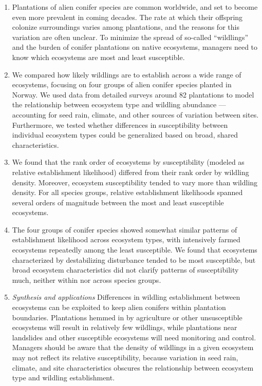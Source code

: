 \documentclass[
]{article}
\providecommand{\tightlist}{%
  \setlength{\itemsep}{0pt}\setlength{\parskip}{0pt}}
\begin{document}
\begin{enumerate}
\def\labelenumi{\arabic{enumi}.}
\tightlist
\item
  Plantations of alien conifer species are common worldwide, and set to become even more prevalent in coming decades. The rate at which their offspring colonize surroundings varies among plantations, and the reasons for this variation are often unclear. To minimize the spread of so-called ``wildlings'' and the burden of conifer plantations on native ecosystems, managers need to know which ecosystems are most and least susceptible.
\item
  We compared how likely wildlings are to establish across a wide range of ecosystems, focusing on four groups of alien conifer species planted in Norway. We used data from detailed surveys around 82 plantations to model the relationship between ecosystem type and wildling abundance --- accounting for seed rain, climate, and other sources of variation between sites. Furthermore, we tested whether differences in susceptibility between individual ecosystem types could be generalized based on broad, shared characteristics.
\item
  We found that the rank order of ecosystems by susceptibility (modeled as relative establishment likelihood) differed from their rank order by wildling density. Moreover, ecosystem susceptibility tended to vary more than wildling density. For all species groups, relative establishment likelihoods spanned several orders of magnitude between the most and least susceptible ecosystems.
\item
  The four groups of conifer species showed somewhat similar patterns of establishment likelihood across ecosystem types, with intensively farmed ecosystems repeatedly among the least susceptible. We found that ecosystems characterized by destabilizing disturbance tended to be most susceptible, but broad ecosystem characteristics did not clarify patterns of susceptibility much, neither within nor across species groups.
\item
  \emph{Synthesis and applications} Differences in wildling establishment between ecosystems can be exploited to keep alien conifers within plantation boundaries. Plantations hemmed in by agriculture or other unsusceptible ecosystems will result in relatively few wildlings, while plantations near landslides and other susceptible ecosystems will need monitoring and control. Managers should be aware that the density of wildlings in a given ecosystem may not reflect its relative susceptibility, because variation in seed rain, climate, and site characteristics obscures the relationship between ecosystem type and wildling establishment.
\end{enumerate}
\end{document}
